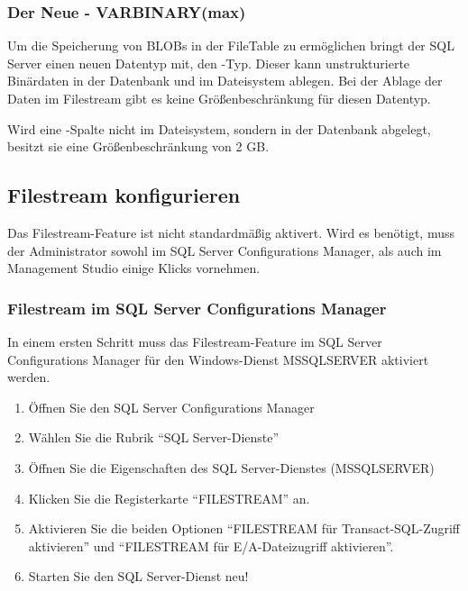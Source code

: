         \subsubsection{Der Neue - VARBINARY(max)}
          Um die Speicherung von BLOBs in der FileTable zu ermöglichen bringt
          der SQL Server einen neuen Datentyp mit, den
          -Typ. Dieser kann unstrukturierte
          Binärdaten in der Datenbank und im Dateisystem ablegen. Bei der Ablage
          der Daten im Filestream gibt es keine Größenbeschränkung für diesen
          Datentyp.
          \begin{merke}
            Wird eine -Spalte nicht im Dateisystem,
            sondern in der Datenbank abgelegt, besitzt sie eine
            Größenbeschränkung von 2 GB.
          \end{merke}
      \subsection{Filestream konfigurieren}
        Das Filestream-Feature ist nicht standardmäßig aktivert. Wird es
        benötigt, muss der Administrator sowohl im SQL Server Configurations
        Manager, als auch im Management Studio einige Klicks vornehmen.
        \subsubsection{Filestream im SQL Server Configurations Manager}
          In einem ersten Schritt muss das Filestream-Feature im SQL Server
          Configurations Manager für den Windows-Dienst MSSQLSERVER aktiviert
          werden.
          \begin{enumerate}
            \item Öffnen Sie den SQL Server Configurations Manager
            \item Wählen Sie die Rubrik \enquote{SQL Server-Dienste}
            \item Öffnen Sie die Eigenschaften des SQL Server-Dienstes
            (MSSQLSERVER)
            \item Klicken Sie die Registerkarte \enquote{FILESTREAM} an.
            \item Aktivieren Sie die beiden Optionen \enquote{FILESTREAM für
            Transact-SQL-Zugriff aktivieren} und \enquote{FILESTREAM für
            E/A-Dateizugriff aktivieren}.
            \item Starten Sie den SQL Server-Dienst neu!
          \end{enumerate}
